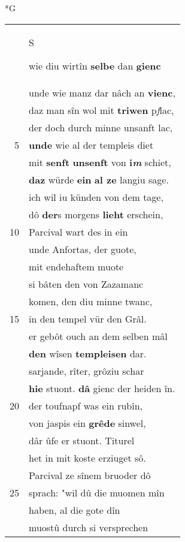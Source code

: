 \documentclass[8pt,a4paper,notitlepage]{article}
\begin{document}
\newpage
\begin{table}[ht]
\begin{minipage}[t]{0.5\linewidth}
\small
\begin{center}*G
\end{center}
\begin{tabular}{rl}
 & \begin{large}S\end{large}wie diu wirtîn \textbf{selbe} dan \textbf{gienc}\\ 
 & unde wie manz dar nâch an \textbf{vienc},\\ 
 & daz man sîn wol mit \textbf{triwen} p\textit{f}lac,\\ 
 & der doch durch minne unsanft lac,\\ 
5 & \textbf{unde} wie al der templeis diet\\ 
 & mit \textbf{senft} \textbf{unsenft} von \textbf{i\textit{m}} schiet,\\ 
 & \textbf{daz} würde \textbf{ein} \textbf{al ze} langiu sage.\\ 
 & ich wil iu künden von dem tage,\\ 
 & dô \textbf{der}s morgens \textbf{lieht} erschein,\\ 
10 & Parcival wart des in ein\\ 
 & unde Anfortas, der guote,\\ 
 & mit endehaftem muote\\ 
 & si bâten den von Zazamanc\\ 
 & komen, den diu minne twanc,\\ 
15 & in den tempel vür den Grâl.\\ 
 & er gebôt ouch an dem selben mâl\\ 
 & \textbf{den} wîsen \textbf{templeisen} dar.\\ 
 & sarjande, rîter, grôziu schar\\ 
 & \textbf{hie} stuont. \textbf{dâ} gienc der heiden în.\\ 
20 & der toufnapf was ein rubîn,\\ 
 & von jaspis ein \textbf{grêde} sinwel,\\ 
 & dâr ûfe er stuont. Titurel\\ 
 & het in mit koste erziuget sô.\\ 
 & Parcival ze sînem bruoder dô\\ 
25 & sprach: "wil dû die muomen mîn\\ 
 & haben, al die gote dîn\\ 
 & muostû durch si versprechen\\ 

\end{tabular}
\end{minipage}
\end{table}
\end{document}
